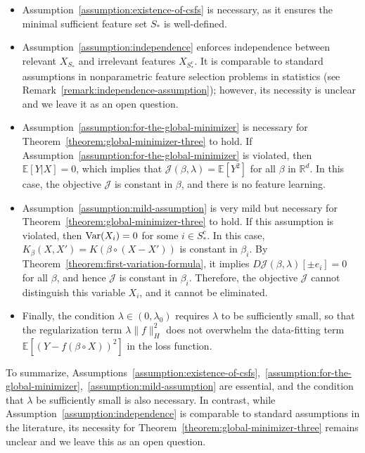 \documentclass[sn-mathphys-num]{sn-jnl}%
\numberwithin{equation}{section}
\newcommand{\R}{\mathbb{R}}
\newcommand{\E}{\mathbb{E}}
\newcommand{\Var}{{\rm Var}}
\theoremstyle{thmstyleone}%
\theoremstyle{thmstyletwo}%
\theoremstyle{thmstylethree}%
\begin{document}
{\vspace{.8em} 
\begin{itemize}
\item Assumption~\ref{assumption:existence-of-csfs} is necessary, as it ensures the minimal sufficient feature set $S_*$ is well-defined.
\vspace{.3em} 
\item  Assumption~\ref{assumption:independence} enforces independence between relevant $X_{S_*}$ and irrelevant features $X_{S_*^c}$. 
It is comparable to standard assumptions in nonparametric feature selection problems in statistics (see Remark~\ref{remark:independence-assumption}); however, its necessity is unclear and we leave it as an open question.
\vspace{.3em} 
\item Assumption~\ref{assumption:for-the-global-minimizer} is necessary for Theorem~\ref{theorem:global-minimizer-three} to hold. If Assumption~\ref{assumption:for-the-global-minimizer} is violated, then $\E[Y| X] = 0$, which implies that $\mathcal{J}(\beta, \lambda) = \E[Y^2]$ for all $\beta$ in $\R^d$. In this case, the objective $\mathcal{J}$ is constant in $\beta$, and there is no feature learning.
\vspace{.3em} 
\item Assumption~\ref{assumption:mild-assumption} is very mild but necessary for Theorem~\ref{theorem:global-minimizer-three} to hold.
If this assumption is violated, then $\Var(X_i) = 0$ for some $i \in S_*^c$. In this case, 
$K_\beta(X, X') = K(\beta \circ (X - X'))$ is constant in $\beta_i$. By Theorem~\ref{theorem:first-variation-formula}, 
it implies $D \mathcal{J}(\beta, \lambda)[\pm e_i] = 0$ for all $\beta$, and hence $\mathcal{J}$ is constant in $\beta_i$. 
Therefore, the objective $\mathcal{J}$ cannot distinguish this variable $X_i$, and it cannot be eliminated.
\vspace{.3em} 
\item Finally, the condition $\lambda \in (0, \lambda_0)$ requires $\lambda$ to be sufficiently small, so that the regularization term $\lambda \|f\|_H^2$ does not overwhelm the data-fitting term $\E[(Y- f(\beta \circ X))^2]$ in the loss function.
\end{itemize} 

\vspace{.8em} 
To summarize, Assumptions~\ref{assumption:existence-of-csfs},~\ref{assumption:for-the-global-minimizer},~\ref{assumption:mild-assumption} are essential, and the condition that $\lambda$ be sufficiently small is also necessary. In contrast, while Assumption~\ref{assumption:independence} is comparable to standard assumptions in the literature, its necessity for Theorem~\ref{theorem:global-minimizer-three} remains unclear and we leave this as an open question.
}
\end{document}

